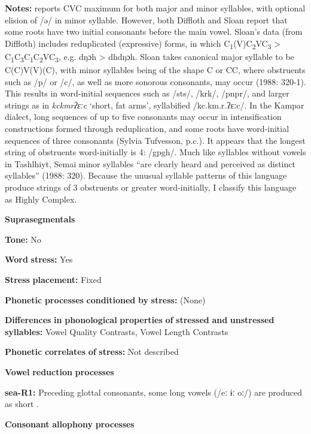 \textbf{Notes:} \citet{Philips2007} reports CVC maximum for both major and minor syllables, with optional elision of /ə/ in minor syllable. However, both Diffloth and Sloan report that some roots have two initial consonants before the main vowel. Sloan’s data (from Diffloth) includes reduplicated (expressive) forms, in which C\textsubscript{1}(V)C\textsubscript{2}VC\textsubscript{3} > C\textsubscript{1}C\textsubscript{3}C\textsubscript{1}C\textsubscript{2}VC\textsubscript{3}, e.g. dŋɔh > dhdŋɔh. Sloan takes canonical major syllable to be C(C)V(V)(C), with minor syllables being of the shape C or CC, where obstruents such as /p/ or /c/, as well as more sonorous consonants, may occur (1988: 320-1). This results in word-initial sequences such as /sts/, /krk/, /pnpr/, and larger strings as in \textit{kckmrʔɛːc} ‘short, fat arms’, syllabified /kc.km.r.ʔɛːc/. In the Kampar dialect, long sequences of up to five consonants may occur in intensification constructions formed through reduplication, and some roots have word-initial sequences of three consonants (Sylvia Tufvesson, p.c.). It appears that the longest string of obstruents word-initially is 4: /gpgh/. Much like syllables without vowels in Tashlhiyt, Semai minor syllables “are clearly heard and perceived as distinct syllables” (1988: 320). Because the unusual syllable patterns of this language produce strings of 3 obstruents or greater word-initially, I classify this language as Highly Complex.

\textbf{Suprasegmentals}

\textbf{Tone:} No

\textbf{Word} \textbf{stress:} Yes

\textbf{Stress} \textbf{placement:} Fixed

\textbf{Phonetic} \textbf{processes} \textbf{conditioned} \textbf{by} \textbf{stress:} (None)

\textbf{Differences} \textbf{in} \textbf{phonological} \textbf{properties} \textbf{of} \textbf{stressed} \textbf{and} \textbf{unstressed} \textbf{syllables:} Vowel Quality Contrasts, Vowel Length Contrasts

\textbf{Phonetic} \textbf{correlates} \textbf{of} \textbf{stress:} Not described

\textbf{Vowel} \textbf{reduction} \textbf{processes}

\textbf{sea-R1:} Preceding glottal consonants, some long vowels (/eː ɨː oː/) are produced as short \citep[10-11]{Philips2007}.

\textbf{Consonant} \textbf{allophony} \textbf{processes}

